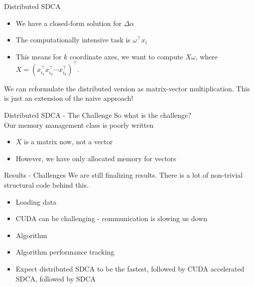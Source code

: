 \documentclass{beamer}
\begin{document}
\begin{frame}{Distributed SDCA}
  \begin{itemize}
    \item We have a closed-form solution for $\Delta \alpha$ \pause
    \item The computationally intensive task is $\omega^\top x_i$ \pause
    \item This means for $k$ coordinate axes, we want to compute $X\omega$,
      where $X = (x_{i_1}^\top x_{i_2}^\top \cdots x_{i_k}^\top)^\top$. \pause
  \end{itemize}
  We can reformulate the distributed version as matrix-vector multiplication.
  This is just an extension of the naive approach!
\end{frame}

\begin{frame}{Distributed SDCA - The Challenge}
  So what is the challenge?\\ \pause
  Our memory management class is poorly written
  \begin{itemize}
    \item $X$ is a matrix now, not a vector\pause
    \item However, we have only allocated memory for vectors
  \end{itemize}
\end{frame}

\begin{frame}{Results - Challenges}
  We are still finalizing results. There is a lot of non-trivial structural code
  behind this.
  \begin{itemize}
    \item Loading data \pause
    \item CUDA can be challenging  - communication is slowing us down\pause
    \item Algorithm \pause
    \item Algorithm performance tracking \pause
    \item Expect distributed SDCA to be the fastest, followed by CUDA
      accelerated SDCA, followed by SDCA
  \end{itemize}
\end{frame}
\end{document}
